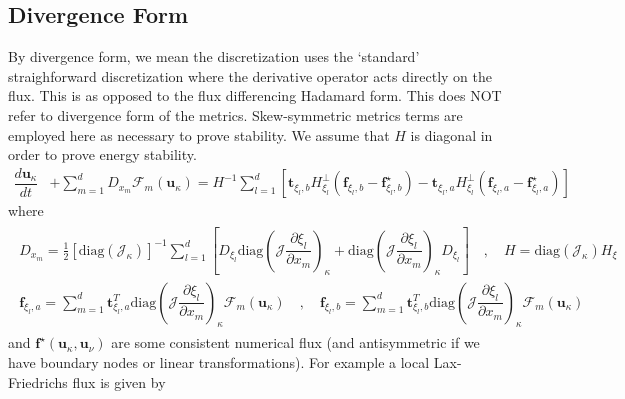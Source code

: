 \documentclass[12pt,a4paper]{article}
\newcommand{\pder}[2][]{\dfrac{\partial #1}{\partial #2}} %
\newcommand{\der}[2][]{\dfrac{d #1}{d #2}} %
\newcommand{\fn}[1]{\mathcal{#1}} %
\newcommand{\fnb}[1]{\bm{\mathcal{#1}}} %
\begin{document}
\subsection{Divergence Form}

By divergence form, we mean the discretization uses the `standard' straighforward discretization where the derivative operator acts directly on the flux. This is as opposed to the flux differencing Hadamard form. This does NOT refer to divergence form of the metrics. Skew-symmetric metrics terms are employed here as necessary to prove stability. We assume that $H$ is diagonal in order to prove energy stability.
\begin{align*}
\der[\bm{u}_\kappa]{t} &+ \sum_{m=1}^d D_{x_m} \fnb{F}_m \left( \bm{u}_\kappa \right) = H^{-1} \sum_{l = 1}^d \left[  \bm{t}_{\xi_l,b} H^{\bot}_{\xi_l} \left(\bm{f}_{\xi_l,b} - \bm{f}^\star_{\xi_l,b} \right)  - \bm{t}_{\xi_l,a} H^{\bot}_{\xi_l} \left(\bm{f}_{\xi_l,a} - \bm{f}^\star_{\xi_l,a}  \right) \right]
\end{align*}
where
\begin{align*}
\begin{gathered}
D_{x_m} = \frac{1}{2} \left[ \text{diag}\left( \fn{J}_\kappa \right) \right]^{-1} \sum_{l=1}^d \left[ D_{\xi_l} \text{diag} \left( \fn{J} \pder[\xi_l]{x_m} \right)_\kappa + \text{diag} \left( \fn{J} \pder[\xi_l]{x_m} \right)_\kappa  D_{\xi_l} \right] \quad , \quad H = \text{diag} \left( \fn{J}_\kappa \right) H_\xi \\
\bm{f}_{\xi_l,a} =  \sum_{m=1}^d \bm{t}^T_{\xi_l,a} \text{diag} \left( \fn{J} \pder[\xi_l]{x_m} \right)_{\kappa} \fnb{F}_m \left( \bm{u}_\kappa \right) \quad , \quad \bm{f}_{\xi_l,b} = \sum_{m=1}^d \bm{t}^T_{\xi_l,b} \text{diag} \left( \fn{J} \pder[\xi_l]{x_m} \right)_{\kappa} \fnb{F}_m \left( \bm{u}_\kappa \right)
\end{gathered}
\end{align*}
and $\bm{f}^\star \left( \bm{u}_\kappa , \bm{u}_\nu \right) $ are some consistent numerical flux (and antisymmetric if we have boundary nodes or linear transformations). For example a local Lax-Friedrichs flux is given by
\end{document}
